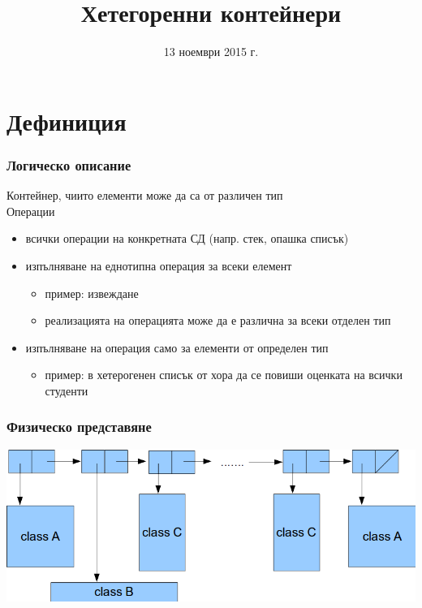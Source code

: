 \documentclass{beamer}
\title{Хетегоренни контейнери}
\date{13 ноември 2015 г.}
\begin{document}
\begin{frame}
  \titlepage
\end{frame}

\section{Дефиниция}

\begin{frame}
  \frametitle{Логическо описание}
  Контейнер, чиито елементи може да са от различен тип\\[1em]
  Операции
  \begin{itemize}
  \item всички операции на конкретната СД (напр. стек, опашка списък)
  \item изпълняване на еднотипна операция за всеки елемент
    \begin{itemize}
    \item пример: извеждане
    \item реализацията на операцията може да е различна за всеки отделен тип
    \end{itemize}
  \item изпълняване на операция само за елементи от определен тип
    \begin{itemize}
    \item пример: в хетерогенен списък от хора да се повиши оценката на всички студенти
    \end{itemize}
  \end{itemize}
\end{frame}

\begin{frame}
  \frametitle{Физическо представяне}
  \includegraphics[width=\textwidth]{images/polylist_example.png}
\end{frame}
\end{document}
